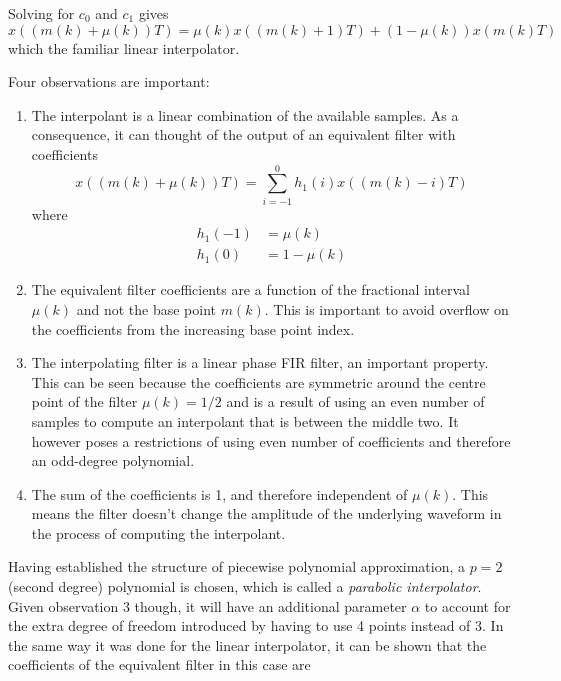 Solving for $c_0$ and $c_1$ gives
\begin{equation}
x((m(k)+\mu(k))T) = \mu(k)x((m(k)+1)T)+(1-\mu(k))x(m(k)T)
\end{equation}
which the familiar linear interpolator.

Four observations are important:
\begin{enumerate}
  \item The interpolant is a linear combination of the available samples. As a consequence, it can thought of the output of an equivalent filter with coefficients
  \begin{equation}
  x((m(k)+\mu(k))T) = \sum_{i=-1}^{0}h_1(i)x((m(k)-i)T)
  \end{equation}
  where
  \begin{align}
  h_1(-1) &= \mu(k)\\
  h_1(0) &= 1 - \mu(k)
  \end{align}

  \item The equivalent filter coefficients are a function of the fractional interval $\mu(k)$ and not the base point $m(k)$. This is important to avoid overflow on the coefficients from the increasing base point index.

  \item The interpolating filter is a linear phase FIR filter, an important property. This can be seen because the coefficients are symmetric around the centre point of the filter $\mu(k) = 1/2$ and is a result of using an even number of samples to compute an interpolant that is between the middle two. It however poses a restrictions of using even number of coefficients and therefore an odd-degree polynomial.

  \item The sum of the coefficients is 1, and therefore independent of $\mu(k)$. This means the filter doesn't change the amplitude of the underlying waveform in the process of computing the interpolant.
\end{enumerate}

Having established the structure of piecewise polynomial approximation, a $p=2$ (second degree) polynomial is chosen, which is called a \emph{parabolic interpolator}. Given observation 3 though, it will have an additional parameter $\alpha$ to account for the extra degree of freedom introduced by having to use 4 points instead of 3. In the same way it was done for the linear interpolator, it can be shown that the coefficients of the equivalent filter in this case are


